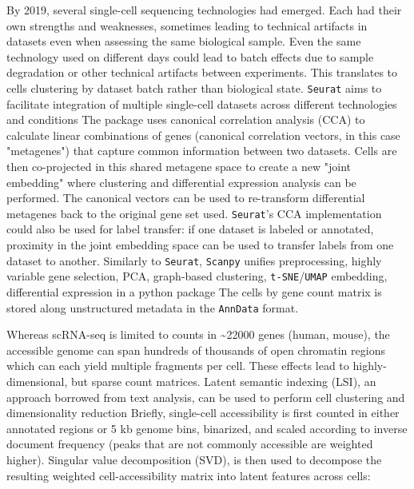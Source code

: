 By 2019, several single-cell sequencing technologies had emerged. Each had their own strengths and weaknesses, sometimes leading to technical artifacts in datasets even when assessing the same biological sample. Even the same technology used on different days could lead to batch effects due to sample degradation or other technical artifacts between experiments. This translates to cells clustering by dataset batch rather than biological state. \verb|Seurat| aims to facilitate integration of multiple single-cell datasets across different technologies and conditions The package uses canonical correlation analysis (CCA) to calculate linear combinations of genes (canonical correlation vectors, in this case "metagenes") that capture common information between two datasets. Cells are then co-projected in this shared metagene space to create a new "joint embedding" where clustering and differential expression analysis can be performed. The canonical vectors can be used to re-transform differential metagenes back to the original gene set used. \verb|Seurat|'s CCA implementation could also be used for label transfer: if one dataset is labeled or annotated, proximity in the joint embedding space can be used to transfer labels from one dataset to another. Similarly to \verb|Seurat|, \verb|Scanpy| unifies preprocessing, highly variable gene selection, PCA, graph-based clustering, \verb|t-SNE|/\verb|UMAP| embedding, differential expression in a python package The cells by gene count matrix is stored along unstructured metadata in the \verb|AnnData| format.

Whereas scRNA-seq is limited to counts in \textasciitilde{\num{22000}} genes (human, mouse), the accessible genome can span hundreds of thousands of open chromatin regions which can each yield multiple fragments per cell. These effects lead to highly-dimensional, but sparse count matrices. Latent semantic indexing (LSI), an approach borrowed from text analysis, can be used to perform cell clustering and dimensionality reduction Briefly, single-cell accessibility is first counted in either annotated regions or 5 kb genome bins, binarized, and scaled according to inverse document frequency (peaks that are not commonly accessible are weighted higher). Singular value decomposition (SVD), is then used to decompose the resulting weighted cell-accessibility matrix into latent features across cells:

